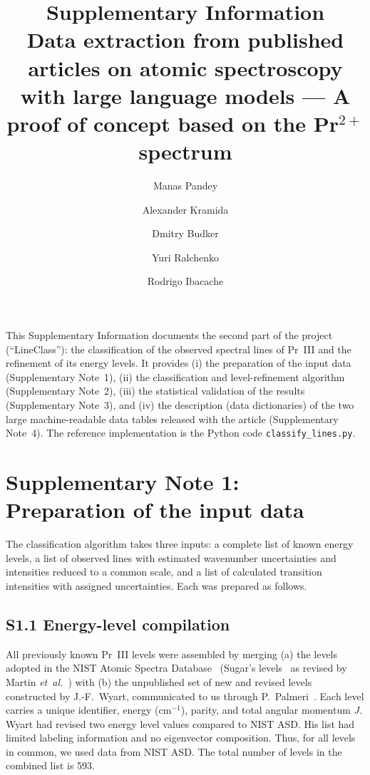 \documentclass[10pt]{article}
\title{Supplementary Information\\[4pt]
\large Data extraction from published articles on atomic spectroscopy with
large language models --- A proof of concept based on the Pr$^{2+}$ spectrum}
\author[1]{Manas Pandey}
\author[2,3,4]{Alexander Kramida}
\author[5,6,7,8,*]{Dmitry Budker}
\author[2,3,4]{Yuri Ralchenko}
\author[2,3,4]{Rodrigo Ibacache}
\affil[ ]{\footnotesize Affiliations as in the main article. $^{*}$budker@uni-mainz.de}
\begin{document}
\maketitle

\noindent
This Supplementary Information documents the second part of the project
(``LineClass''): the classification of the observed spectral lines of
Pr~III and the refinement of its energy levels. It provides (i) the
preparation of the input data (Supplementary Note~1), (ii) the
classification and level-refinement algorithm (Supplementary Note~2),
(iii) the statistical validation of the results (Supplementary Note~3),
and (iv) the description (data dictionaries) of the two large machine-readable
data tables released with the article (Supplementary Note~4). The reference
implementation is the Python code \texttt{classify\_lines.py}.


\section*{Supplementary Note 1: Preparation of the input data}
\label{sn:dataprep}

The classification algorithm takes three inputs: a complete list of known
energy levels, a list of observed lines with estimated wavenumber
uncertainties and intensities reduced to a common scale, and a list of
calculated transition intensities with assigned uncertainties. Each was
prepared as follows.

\subsection*{S1.1 Energy-level compilation}
\label{ssec:levels}
All previously known Pr~III levels were assembled by
merging (a) the levels adopted in the NIST Atomic Spectra
Database~\cite{NIST_ASD} (Sugar's levels~\cite{Sugar1969} as
revised by Martin \textit{et~al.}~\cite{Martin1978}) with (b) the
unpublished set of new and revised levels constructed by J.-F.~Wyart,
communicated to us through P.~Palmeri~\cite{Wyart_unpub}. Each level
carries a unique identifier, energy (cm$^{-1}$), parity, and total
angular momentum $J$. Wyart had revised two energy level values compared to NIST ASD.
His list had limited labeling information and no eigenvector composition. 
Thus, for all levels in common, we used data from NIST ASD. The total number 
of levels in the combined list is 593.
\end{document}
